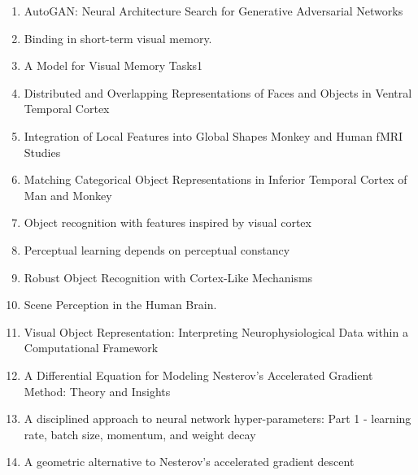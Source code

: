 \documentclass[acmlarge]{acmart}
\begin{document}
\begin{enumerate}
	\item AutoGAN: Neural Architecture Search for Generative Adversarial Networks \cite{Gong2019AutoGANNA} 

	\item Binding in short-term visual memory. \cite{Wheeler2002BindingIS} 

	\item A Model for Visual Memory Tasks1 \cite{Sperling1963AMF} 

	\item Distributed and Overlapping Representations of Faces and Objects in Ventral Temporal Cortex \cite{Haxby2001DistributedAO} 

	\item Integration of Local Features into Global Shapes Monkey and Human fMRI Studies \cite{Kourtzi2003IntegrationOL} 

	\item Matching Categorical Object Representations in Inferior Temporal Cortex of Man and Monkey \cite{Kriegeskorte2008MatchingCO} 

	\item Object recognition with features inspired by visual cortex \cite{Serre2005ObjectRW} 

	\item Perceptual learning depends on perceptual constancy \cite{Garrigan2008PerceptualLD} 

	\item Robust Object Recognition with Cortex-Like Mechanisms \cite{Serre2007RobustOR} 

	\item Scene Perception in the Human Brain. \cite{Epstein2019ScenePI} 

	\item Visual Object Representation: Interpreting Neurophysiological Data within a Computational Framework \cite{Plaut1990VisualOR} 

	\item A Differential Equation for Modeling Nesterov's Accelerated Gradient Method: Theory and Insights \cite{Su2014ADE} 

	\item A disciplined approach to neural network hyper-parameters: Part 1 - learning rate, batch size, momentum, and weight decay \cite{Smith2018ADA} 

	\item A geometric alternative to Nesterov's accelerated gradient descent \cite{Bubeck2015AGA} 


\end{enumerate}
\end{document}
